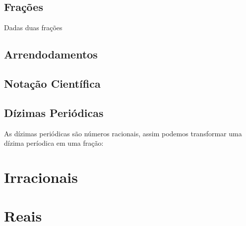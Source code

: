 \documentclass[twocolumn,oneside,a4paper,12pt]{article}
\begin{document}
\subsection{Frações}
Dadas duas frações 

\subsection*{Arrendodamentos}

\subsection*{Notação Científica}


\subsection*{Dízimas Periódicas}
As dízimas periódicas são números racionais, assim podemos transformar uma dízima períodica em uma fração:

\section*{Irracionais}


\section*{Reais}
\end{document}
